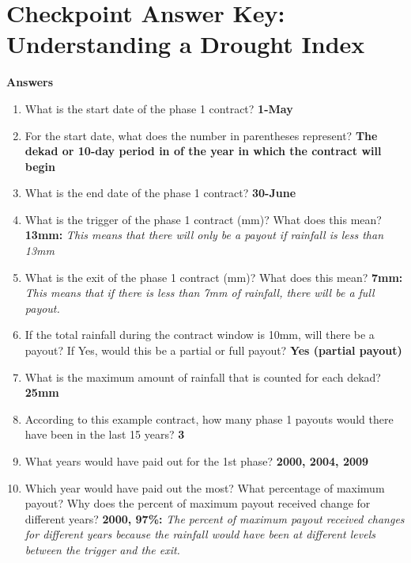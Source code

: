 \documentclass[letterpaper,10pt,english]{sphinxmanual}
\begin{document}
\section{Checkpoint Answer Key: Understanding a Drought Index}
\label{whatisindexinsurance/understandingadroughtindexanskey_en::doc}\label{whatisindexinsurance/understandingadroughtindexanskey_en:checkpoint-answer-key-understanding-a-drought-index}
\textbf{Answers}
\begin{enumerate}
\item {} 
What is the start date of the phase 1 contract? \textbf{1-May}

\item {} 
For the start date, what does the number in parentheses represent? \textbf{The dekad or 10-day period in of the year in which the contract will begin}

\item {} 
What is the end date of the phase 1 contract? \textbf{30-June}

\item {} 
What is the trigger of the phase 1 contract (mm)? What does this mean? \textbf{13mm:} \emph{This means that there will only be a payout if rainfall is less than 13mm}

\item {} 
What is the exit of the phase 1 contract (mm)? What does this mean? \textbf{7mm:} \emph{This means that if there is less than 7mm of rainfall, there will be a full payout.}

\item {} 
If the total rainfall during the contract window is 10mm, will there be a payout? If Yes, would this be a partial or full payout? \textbf{Yes (partial payout)}

\item {} 
What is the maximum amount of rainfall that is counted for each dekad? \textbf{25mm}

\item {} 
According to this example contract, how many phase 1 payouts would there have been in the last 15 years? \textbf{3}

\item {} 
What years would have paid out for the 1st phase? \textbf{2000, 2004, 2009}

\item {} 
Which year would have paid out the most?  What percentage of maximum payout? Why does the percent of maximum payout received change for different years? \textbf{2000, 97\%:} \emph{The percent of maximum payout received changes for different years because the rainfall would have been at different levels between the trigger and the exit.}

\end{enumerate}
\end{document}
